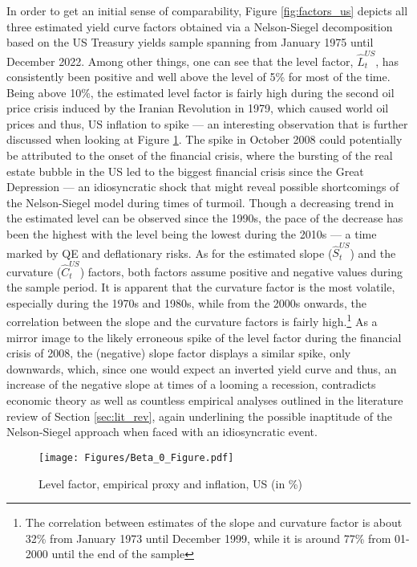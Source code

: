 In order to get an initial sense of comparability, Figure \ref{fig:factors_us} depicts all three estimated yield curve factors obtained via a Nelson-Siegel decomposition based on the US Treasury yields sample spanning from January 1975 until December 2022.
Among other things, one can see that the level factor, $\hat{L}^{US}_{t}$, has consistently been positive and well above the level of 5\% for most of the time. 
Being above 10\%, the estimated level factor is fairly high during the second oil price crisis induced by the Iranian Revolution in 1979, which caused world oil prices and thus, US inflation to spike --- an interesting observation that is further discussed when looking at Figure \ref{fig:level_factor_us}. 
The spike in October 2008 could potentially be attributed to the onset of the financial crisis, where the bursting of the real estate bubble in the US led to the biggest financial crisis since the Great Depression --- an idiosyncratic shock that might reveal possible shortcomings of the Nelson-Siegel model during times of turmoil. 
Though a decreasing trend in the estimated level can be observed since the 1990s, the pace of the decrease has been the highest with the level being the lowest during the 2010s --- a time marked by QE and deflationary risks. 
As for the estimated slope ($\hat{S}^{US}_{t}$) and the curvature ($\hat{C}^{US}_{t}$) factors, both factors assume positive and negative values during the sample period. 
It is apparent that the curvature factor is the most volatile, especially during the 1970s and 1980s, while from the 2000s onwards, the correlation between the slope and the curvature factors is fairly high.\footnote{The correlation between estimates of the slope and curvature factor is about 32\% from January 1973 until December 1999, while it is around 77\% from 01-2000 until the end of the sample}
As a mirror image to the likely erroneous spike of the level factor during the financial crisis of 2008, the (negative) slope factor displays a similar spike, only downwards, which, since one would expect an inverted yield curve and thus, an increase of the negative slope at times of a looming a recession, contradicts economic theory as well as countless empirical analyses outlined in the literature review of Section \ref{sec:lit_rev}, again underlining the possible inaptitude of the Nelson-Siegel approach when faced with an idiosyncratic event. 

\begin{figure}[!t]
    \centering
    \texttt{[image: Figures/Beta\_0\_Figure.pdf]}
    \caption{Level factor, empirical proxy and inflation, US (in \%)}
    \label{fig:level_factor_us}
\end{figure}

